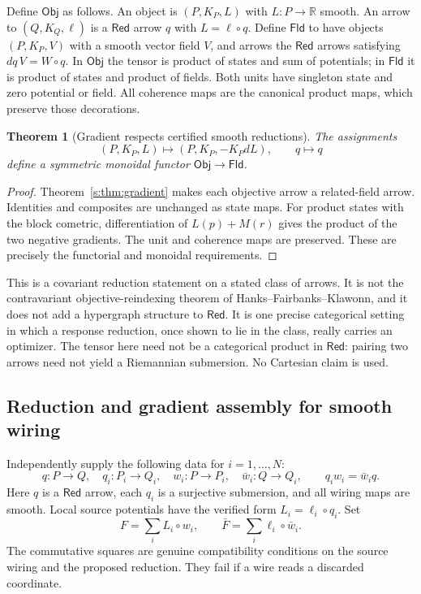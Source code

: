 \documentclass[11pt]{article}
\newtheorem{theorem}{Theorem}[section]
\theoremstyle{definition}
\theoremstyle{remark}\newtheorem{remark}[theorem]{Remark}
\newcommand{\R}{\mathbb R}
\newcommand{\Ob}{\mathsf{Obj}}
\newcommand{\VF}{\mathsf{Fld}}
\newcommand{\Red}{\mathsf{Red}}
\begin{document}
Define $\Ob$ as follows. An object is $(P,K_P,L)$ with $L:P\to\R$ smooth.
An arrow to $(Q,K_Q,\ell)$ is a $\Red$ arrow $q$ with $L=\ell\circ q$.
Define $\VF$ to have objects $(P,K_P,V)$ with a smooth vector field $V$,
and arrows the $\Red$ arrows satisfying $dq\,V=W\circ q$.
In $\Ob$ the tensor is product of states and sum of potentials; in $\VF$
it is product of states and product of fields. Both units have singleton
state and zero potential or field. All coherence maps are the canonical
product maps, which preserve those decorations.

\begin{theorem}[Gradient respects certified smooth reductions]
\label{s:thm:functor}
The assignments
\[
 (P,K_P,L)\longmapsto(P,K_P,-K_PdL),\qquad q\longmapsto q
\]
define a symmetric monoidal functor $\Ob\to\VF$.
\end{theorem}
\begin{proof}
Theorem~\ref{s:thm:gradient} makes each objective arrow a related-field
arrow. Identities and composites are unchanged as state maps. For product
states with the block cometric, differentiation of
$L(p)+M(r)$ gives the product of the two negative gradients. The unit and
coherence maps are preserved. These are precisely the functorial and
monoidal requirements.
\end{proof}
This is a covariant reduction statement on a stated class of arrows. It is
not the contravariant objective-reindexing theorem of
Hanks--Fairbanks--Klawonn, and it does not add a hypergraph structure to
$\Red$. It is one precise categorical setting in which a response
reduction, once shown to lie in the class, really carries an optimizer.
The tensor here need not be a categorical product in $\Red$: pairing two
arrows need not yield a Riemannian submersion. No Cartesian claim is used.

\subsection{Reduction and gradient assembly for smooth wiring}
\label{s:sec:wiring}
Independently supply the following data for $i=1,\ldots,N$:
\[
 q:P\to Q,\quad q_i:P_i\to Q_i,\quad
 w_i:P\to P_i,\quad \bar w_i:Q\to Q_i,
 \qquad q_iw_i=\bar w_iq.
\]
Here $q$ is a $\Red$ arrow, each $q_i$ is a surjective submersion, and all
wiring maps are smooth. Local source potentials have the verified form
$L_i=\ell_i\circ q_i$. Set
\begin{equation}\label{s:eq:wired-loss}
 F=\sum_i L_i\circ w_i,\qquad
 \bar F=\sum_i\ell_i\circ\bar w_i.
\end{equation}
The commutative squares are genuine compatibility conditions on the source
wiring and the proposed reduction. They fail if a wire reads a discarded
coordinate.
\end{document}
